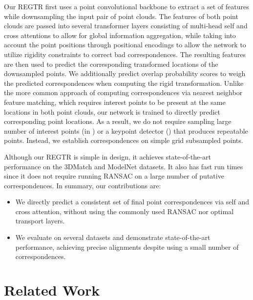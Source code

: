 \documentclass[10pt,twocolumn,letterpaper]{article}
\begin{document}
Our REGTR first uses a point convolutional backbone \cite{thomas2019kpconv} to extract a set of features while downsampling the input pair of point clouds. The features of both point clouds are passed into several transformer \cite{vaswani2017attention} layers consisting of multi-head self and cross attentions to allow for global information aggregation, while taking into account the point positions through positional encodings to allow the network to utilize rigidity constraints to correct bad correspondences. 
The resulting features are then used to predict the corresponding transformed locations of the downsampled points.
We additionally predict overlap probability scores to weigh the predicted correspondences when computing the rigid transformation. 
Unlike the more common approach of computing correspondences via nearest neighbor feature matching, which requires interest points to be present at the same locations in both point clouds, our network is trained to directly predict corresponding point locations. As a result, we do not require sampling large number of interest points (\eg in \cite{zeng20163dmatch,huang2021predator}) or a keypoint detector (\eg \cite{zhong2009iss,li2019usip}) that produces repeatable points. Instead, we establish correspondences on simple grid subsampled points.


Although our REGTR is simple in design, it achieves state-of-the-art performance on the 3DMatch \cite{zeng20163dmatch} and ModelNet \cite{wu2015modelnet} datasets. It also has fast run times since it does not require running RANSAC on a large number of putative correspondences. 
In summary, our contributions are:
\vspace{-2mm}
\begin{itemize}
\setlength\itemsep{-0.1em}
    \item We directly predict a consistent set of final point correspondences via self and cross attention, without using the commonly used RANSAC nor optimal transport layers.
    \item We evaluate on several datasets and demonstrate state-of-the-art performance, achieving precise alignments despite using a small number of correspondences.
\end{itemize}
\vspace{-2mm}



\section{Related Work}
\end{document}
